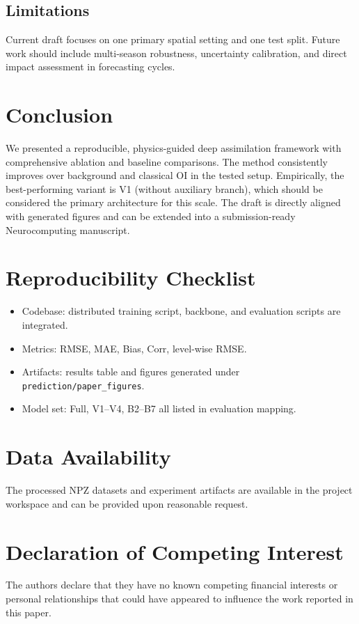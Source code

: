\documentclass[preprint,12pt]{elsarticle}
\begin{document}
\subsection{Limitations}
Current draft focuses on one primary spatial setting and one test split. Future work should include multi-season robustness, uncertainty calibration, and direct impact assessment in forecasting cycles.

\section{Conclusion}
We presented a reproducible, physics-guided deep assimilation framework with comprehensive ablation and baseline comparisons. The method consistently improves over background and classical OI in the tested setup. Empirically, the best-performing variant is V1 (without auxiliary branch), which should be considered the primary architecture for this scale. The draft is directly aligned with generated figures and can be extended into a submission-ready Neurocomputing manuscript.

\section*{Reproducibility Checklist}
\begin{itemize}[leftmargin=*]
\item Codebase: distributed training script, backbone, and evaluation scripts are integrated.
\item Metrics: RMSE, MAE, Bias, Corr, level-wise RMSE.
\item Artifacts: results table and figures generated under \texttt{prediction/paper_figures}.
\item Model set: Full, V1--V4, B2--B7 all listed in evaluation mapping.
\end{itemize}

\section*{Data Availability}
The processed NPZ datasets and experiment artifacts are available in the project workspace and can be provided upon reasonable request.

\section*{Declaration of Competing Interest}
The authors declare that they have no known competing financial interests or personal relationships that could have appeared to influence the work reported in this paper.
\end{document}

